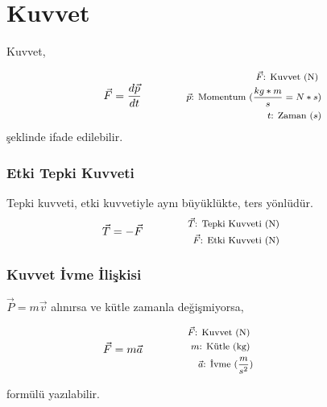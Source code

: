 \section{Kuvvet}

Kuvvet,

\begin{equation}
    \vec{F} = \frac{d\vec{p}}{dt} \qquad \qquad \parbox{4cm}{\footnotesize$
    \begin{aligned}
        \vec{F}\text{: Kuvvet (N) } \\ 
        \vec{p}\text{: Momentum } (\frac{kg*m}{s} = N*s) \\
        t\text{: Zaman } (s)
    \end{aligned}$
    }
\end{equation}
şeklinde ifade edilebilir. 

\subsubsection*{Etki Tepki Kuvveti}
Tepki kuvveti, etki kuvvetiyle aynı büyüklükte, ters yönlüdür.
\begin{equation}
    \vec{T} = -\vec{F} \qquad \qquad \parbox{4cm}{\footnotesize$\begin{aligned}
        \vec{T}\text{: Tepki Kuvveti (N) } \\
        \vec{F}\text{: Etki Kuvveti (N) }
\end{aligned}$}
\end{equation}

\subsubsection*{Kuvvet İvme İlişkisi}

$\vec{P} = m\vec{v}$ alınırsa ve kütle zamanla değişmiyorsa,

\begin{equation}
    \vec{F} = m\vec{a} \qquad \qquad \parbox{4cm}{\footnotesize$\begin{aligned}
        \vec{F}\text{: Kuvvet (N) } \\
        m\text{: Kütle (kg) } \\
        \vec{a}\text{: İvme } (\frac{m}{s^2})
    \end{aligned}$}
\end{equation}

formülü yazılabilir.

